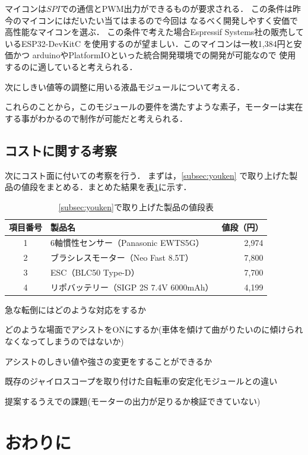 \documentclass[uplatex,dvipdfmx]{jsarticle}
\begin{document}
マイコンは$SPI$での通信とPWM出力ができるものが要求される．
この条件は昨今のマイコンにはだいたい当てはまるので今回は
なるべく開発しやすく安価で高性能なマイコンを選ぶ．
この条件で考えた場合Espressif Systems社の販売しているESP32-DevKitC
を使用するのが望ましい．このマイコンは一枚1,384円と安価かつ
arduinoやPlatformIOといった統合開発環境での開発が可能なので
使用するのに適していると考えられる．

次にしきい値等の調整に用いる液晶モジュールについて考える．


これらのことから，このモジュールの要件を満たすような素子，モーターは実在
する事がわかるので制作が可能だと考えられる．

\subsection{コストに関する考察}

次にコスト面に付いての考察を行う．
まずは，\ref{subsec:youken}
で取り上げた製品の値段をまとめる．まとめた結果を表\ref{table:Price}に示す．

\begin{table}[h]
  \centering
  \caption{\ref{subsec:youken}で取り上げた製品の値段表}
  \label{table:Price}
  \begin{tabular}{|c|l|r|}
\hline
項目番号 & 製品名 & 値段（円） \\\hline \hline
1 & 6軸慣性センサー（Panasonic EWTS5G） & 2,974 \\\hline
2 & ブラシレスモーター（Neo Fast 8.5T） & 7,800 \\\hline
3 & ESC（BLC50 Type-D） & 7,700 \\\hline
4 & リポバッテリー（SIGP 2S 7.4V 6000mAh） & 4,199 \\\hline
  \end{tabular}
\end{table}

急な転倒にはどのような対応をするか

どのような場面でアシストをONにするか(車体を傾けて曲がりたいのに傾けられなくなってしまうのではないか)

アシストのしきい値や強さの変更をすることができるか

既存のジャイロスコープを取り付けた自転車の安定化モジュールとの違い

提案するうえでの課題(モーターの出力が足りるか検証できていない)

\section{おわりに}
\end{document}
